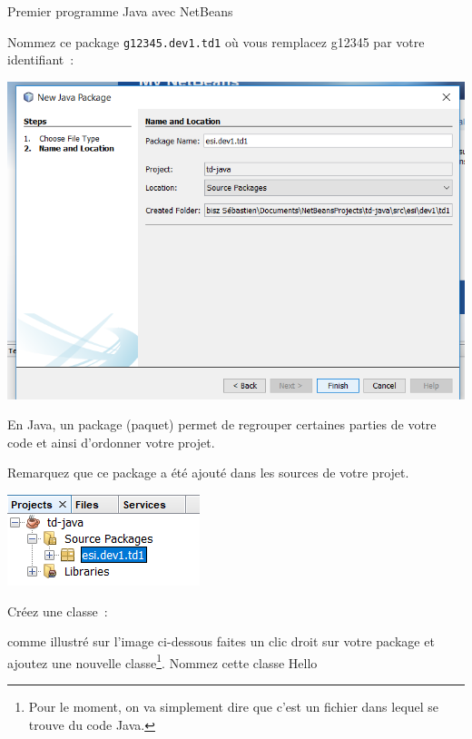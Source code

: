 \documentclass[a4paper,11pt]{article}
\begin{document}
\begin{Tutoriel}{Premier programme Java avec NetBeans}
\begin{steps}
			Nommez ce package \texttt{g12345.dev1.td1} où vous remplacez g12345 par votre identifiant~:
			
			\bigskip
			\begin{center}
				\includegraphics[width=\textwidth]{images/nb_newproject_package2}
			\end{center}
			
			En Java, un package (paquet) permet de regrouper certaines parties de votre code
			et ainsi d'ordonner votre projet.

			Remarquez que ce package a été ajouté dans les sources de votre projet. 
			\bigskip
			\begin{center}
				\includegraphics{images/nb_newproject_package3}
			\end{center}
			


		\item Créez une classe~:
		
			comme illustré sur l'image ci-dessous faites un clic droit sur votre package 
			et ajoutez une nouvelle classe\footnote{Pour le moment, 
			on va simplement dire que c'est un fichier dans lequel se trouve du code Java.}. 
			Nommez cette classe {Hello}
		

\end{steps}
\end{Tutoriel}
\end{document}

